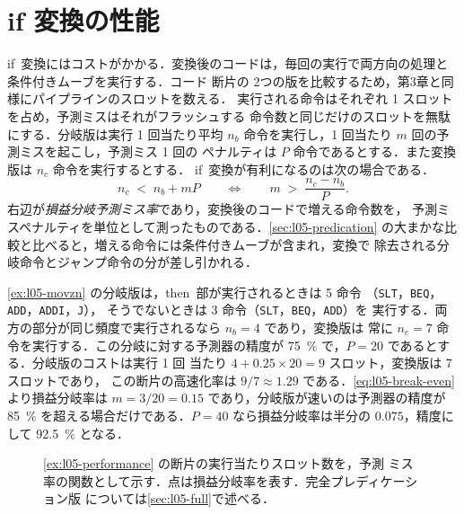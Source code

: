 \documentclass[../main.tex]{subfiles}
\begin{document}
\section{if 変換の性能}
\label{sec:l05-performance}

if~変換にはコストがかかる．変換後のコードは，毎回の実行で両方向の処理と
条件付きムーブを実行する．コード
断片の 2つの版を比較するため，第3章と同様にパイプラインのスロットを数える．
実行される命令はそれぞれ 1 スロットを占め，予測ミスはそれがフラッシュする
命令数と同じだけのスロットを無駄にする．分岐版は実行 1 回当たり平均
$n_b$ 命令を実行し，1 回当たり $m$ 回の予測ミスを起こし，予測ミス 1 回の
ペナルティは $P$ 命令であるとする．また変換版は $n_c$ 命令を実行するとする．%
if~変換が有利になるのは次の場合である．
\begin{equation}
  n_c \;<\; n_b + mP
  \qquad\Longleftrightarrow\qquad
  m \;>\; \frac{n_c - n_b}{P} .
  \label{eq:l05-break-even}
\end{equation}
右辺が\emph{損益分岐予測ミス率}であり，変換後のコードで増える命令数を，
予測ミスペナルティを単位として測ったものである．\cref{sec:l05-predication}%
の大まかな比較と比べると，増える命令には条件付きムーブが含まれ，変換で
除去される分岐命令とジャンプ命令の分が差し引かれる．

\begin{example}
  \label{ex:l05-performance}
  \cref{ex:l05-movzn} の分岐版は，then~部が実行されるときは 5 命令
  （\texttt{SLT}，\texttt{BEQ}，\texttt{ADD}，\texttt{ADDI}，\texttt{J}），
  そうでないときは 3 命令（\texttt{SLT}，\texttt{BEQ}，\texttt{ADD}）を
  実行する．両方の部分が同じ頻度で実行されるなら $n_b = 4$ であり，変換版は
  常に $n_c = 7$ 命令を実行する．この分岐に対する予測器の精度が
  \SI{75}{\percent} で，$P = 20$ であるとする．分岐版のコストは実行 1 回
  当たり $4 + 0.25 \times 20 = 9$ スロット，変換版は 7 スロットであり，
  この断片の高速化率は $9/7 \approx 1.29$ である．\cref{eq:l05-break-even}
  より損益分岐率は $m = 3/20 = 0.15$ であり，分岐版が速いのは予測器の精度が
  \SI{85}{\percent} を超える場合だけである．$P = 40$ なら損益分岐率は半分の
  $0.075$，精度にして \SI{92.5}{\percent} となる．
\end{example}

\begin{figure}[htbp]
  \centering
  
  \caption{\cref{ex:l05-performance} の断片の実行当たりスロット数を，予測
    ミス率の関数として示す．点は損益分岐率を表す．完全プレディケーション版
    については\cref{sec:l05-full}で述べる．}
  \label{fig:l05-break-even}
\end{figure}
\end{document}
